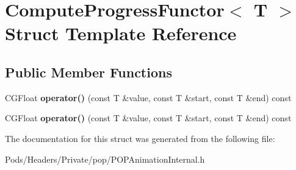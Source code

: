 \hypertarget{struct_compute_progress_functor}{}\section{Compute\+Progress\+Functor$<$ T $>$ Struct Template Reference}
\label{struct_compute_progress_functor}
\subsection*{Public Member Functions}
\begin{DoxyCompactItemize}
\item 
\mbox{\label{struct_compute_progress_functor_a5ab93b145771a979f820f5aec3ebf577}} 
C\+G\+Float {\bfseries operator()} (const T \&value, const T \&start, const T \&end) const
\item 
\mbox{\label{struct_compute_progress_functor_a5ab93b145771a979f820f5aec3ebf577}} 
C\+G\+Float {\bfseries operator()} (const T \&value, const T \&start, const T \&end) const
\end{DoxyCompactItemize}


The documentation for this struct was generated from the following file\+:\begin{DoxyCompactItemize}
\item 
Pods/\+Headers/\+Private/pop/P\+O\+P\+Animation\+Internal.\+h\end{DoxyCompactItemize}
